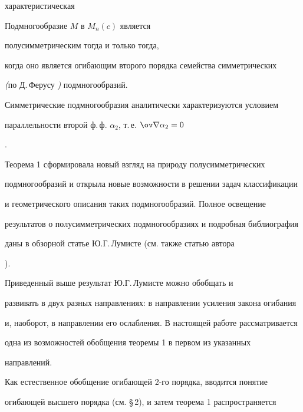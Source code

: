 характеристическая 


 


\begin{thm} Подмногообразие $M$ в $M_n(c)$ является 


полусимметрическим тогда и только тогда, 


когда оно является огибающим второго порядка семейства симметрических 


{\em (}по Д.\,Ферусу {\em \cite{Fer})} подмногообразий. 


\end{thm} 


 


Симметрические подмногообразия аналитически характеризуются условием 


параллельности второй ф.\,ф. $\alpha_2$, т.\,е. $\ov\na\alpha_2=0$ 


\cite{Fer}. 


 


Теорема 1 сформировала новый взгляд на природу полусимметрических 


подмногообразий и открыла новые возможности в решении задач классификации 


и геометрического описания таких подмногообразий. Полное освещение 


результатов о полусимметрических подмногообразиях и подробная библиография 


даны в обзорной статье Ю.Г.\,Лумисте \cite{Lum2} (см. также статью автора 


\cite{Mir}). 


 


Приведенный выше результат Ю.Г.\,Лумисте можно обобщать и 


развивать в двух разных направлениях: в направлении усиления закона огибания


и, наоборот, в направлении его ослабления. В настоящей работе рассматривается 


одна из возможностей обобщения теоремы 1 в первом из указанных 


направлений. 


 


Как естественное обобщение огибающей 2-го порядка, вводится понятие 


огибающей высшего порядка (см. \S\,2), и затем теорема 1 распространяется 


